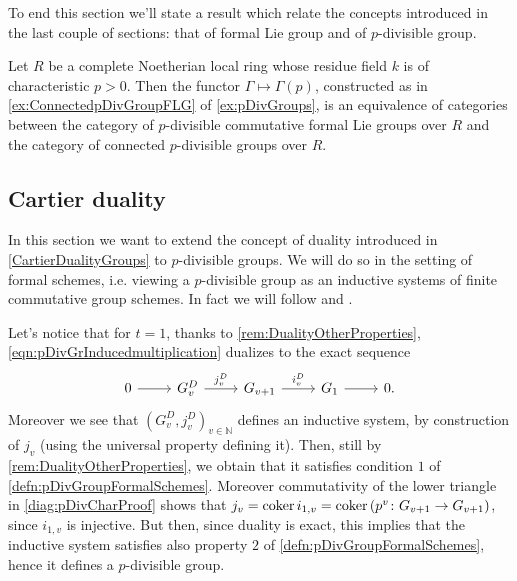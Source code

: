 \documentclass[../Main]{subfiles}
\begin{document}
\noindent
To end this section we'll state a result
which relate the concepts introduced in the last couple of sections:
that of formal Lie group and of $p$-divisible group.


\begin{prop}\label{prop:equivCatConnpDivGr}
	Let $R$ be a complete Noetherian local ring whose residue field $k$
	is of characteristic $p > 0$.
	Then the functor $\Gamma \mapsto \Gamma(p)$, constructed as in \cref{ex:ConnectedpDivGroupFLG}
	of \cref{ex:pDivGroups},
	is an equivalence of categories
	between the category of $p$-divisible commutative formal Lie groups over $R$
	and the category of connected $p$-divisible groups over $R$.
\end{prop}



\subsection{Cartier duality}%
In this section we want to extend the concept of duality introduced in \cref{CartierDualityGroups}
to $p$-divisible groups.
We will do so in the setting of formal schemes,
i.e. viewing a $p$-divisible group as an inductive systems of finite commutative group schemes.
In fact we will follow \cite[\S6]{Shatz} and \cite[\S2.3]{TatePC}.


\begin{rem}[]\label{rem:DualInductiveSystem}
	Let's notice that for $t = 1$, thanks to \cref{rem:DualityOtherProperties}, 
	\cref{eqn:pDivGrInducedmultiplication} dualizes to the exact sequence
	\begin{equation*}
	\begin{tikzcd}
		0 \arrow[r, "", rightarrow] &
		G_v^D \arrow[r, "j_v^D", rightarrow] &
		G_{v+1} \arrow[r, "i_v^D", rightarrow] &
		G_1 \arrow[r, "", rightarrow] &
		0
	.\end{tikzcd}
	\end{equation*}
	Moreover we see that $\left( G_v^D, j_v^D \right)_{v \in \mathbb{N}}$
	defines an inductive system, by construction of $j_v$ (using the universal property
	defining it).
	Then, still by \cref{rem:DualityOtherProperties}, we obtain that it satisfies condition
	$1$ of \cref{defn:pDivGroupFormalSchemes}.
	Moreover commutativity of the lower triangle in \cref{diag:pDivCharProof}
	shows that $j_v = \operatorname{coker} i_{1,v} = \operatorname{coker} \left( p^v\colon G_{v+1} \to G_{v+1} \right)$,
	since $i_{1,v}$ is injective.
	But then, since duality is exact, this implies that the inductive system
	satisfies also property $2$ of \cref{defn:pDivGroupFormalSchemes},
	hence it defines a $p$-divisible group.
\end{rem}
\end{document}
